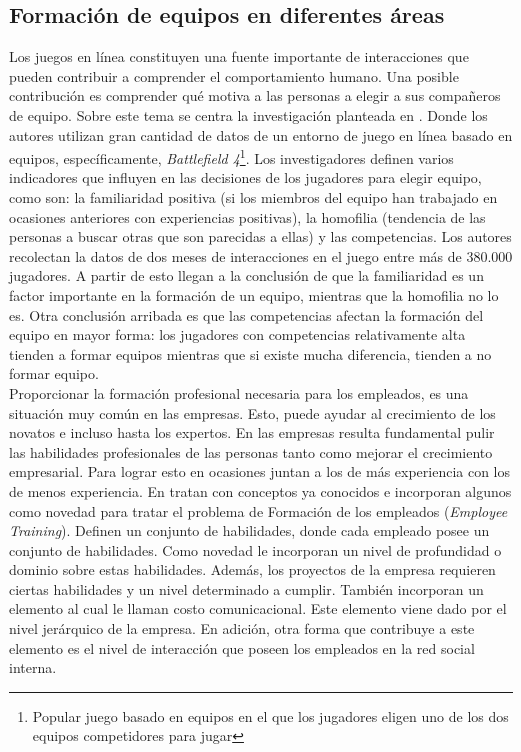 \subsection{Formación de equipos en diferentes áreas}
Los juegos en línea constituyen una fuente importante de interacciones que pueden contribuir a comprender el comportamiento humano. Una posible contribución es comprender qué motiva a las personas a elegir a sus compañeros de equipo. Sobre este tema se centra la investigación planteada en \cite{Alhazmi2017}. Donde los autores utilizan gran cantidad de datos de un entorno de juego en línea basado en equipos, específicamente, \textit{Battlefield 4}\footnote{Popular juego basado en equipos en el que los jugadores eligen uno de los dos equipos competidores para jugar}. Los investigadores definen varios indicadores que influyen en las decisiones de los jugadores para elegir equipo, como son: la familiaridad positiva (si los miembros del equipo han trabajado en ocasiones anteriores con experiencias positivas), la homofilia (tendencia de las personas a buscar otras que son parecidas a ellas) y las competencias. Los autores recolectan la datos de dos meses de interacciones en el juego entre más de 380.000 jugadores. A partir de esto llegan a la conclusión de que la familiaridad es un factor importante en la formación de un equipo, mientras que la homofilia no lo es. Otra conclusión arribada es que las competencias afectan la formación del equipo en mayor forma: los jugadores con competencias relativamente alta tienden a formar equipos mientras que si existe mucha diferencia, tienden a no formar equipo.\\

Proporcionar la formación profesional necesaria para los empleados, es una situación muy común en las empresas. Esto, puede ayudar al crecimiento de los novatos e incluso hasta los expertos. En las empresas resulta fundamental pulir las habilidades profesionales de las personas tanto como mejorar el crecimiento empresarial. Para lograr esto en ocasiones juntan a los de más experiencia con los de menos experiencia. En \cite{Zhang2017} tratan con conceptos ya conocidos e incorporan algunos como novedad para tratar el problema de Formación de los empleados (\textit{Employee Training}). Definen un conjunto de habilidades, donde cada empleado posee un conjunto de habilidades. Como novedad le incorporan un nivel de profundidad o dominio sobre estas habilidades. Además, los proyectos de la empresa requieren ciertas habilidades y un nivel determinado a cumplir. También incorporan un elemento al cual le llaman costo comunicacional. Este elemento viene dado por el nivel jerárquico de la empresa. En adición, otra forma que contribuye a este elemento es el nivel de interacción que poseen los empleados en la red social interna.\\

